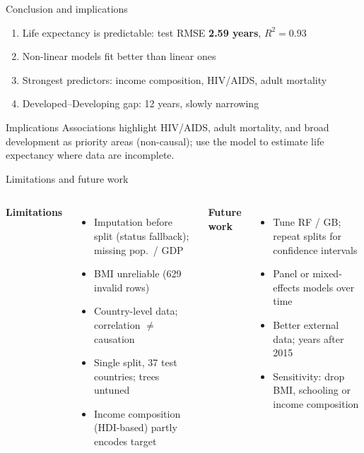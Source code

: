 \begin{frame}{Conclusion and implications}
  \begin{enumerate}
    \item Life expectancy is predictable: test RMSE \textbf{2.59 years}, $R^2=0.93$
    \item Non-linear models fit better than linear ones
    \item Strongest predictors: income composition, HIV/AIDS, adult mortality
    \item Developed--Developing gap: 12 years, slowly narrowing
  \end{enumerate}
  \vspace{0.2cm}
  \begin{block}{Implications}
    \small Associations highlight HIV/AIDS, adult mortality, and broad development as priority areas
    (non-causal); use the model to estimate life expectancy where data are incomplete.
  \end{block}
\end{frame}

\begin{frame}{Limitations and future work}
  \begin{columns}[T]
    \textbf{\color{aupp}Limitations}
    \begin{itemize}\small
      \item Imputation before split (status fallback); missing pop.\ / GDP
      \item BMI unreliable (629 invalid rows)
      \item Country-level data; correlation $\neq$ causation
      \item Single split, 37 test countries; trees untuned
      \item Income composition (HDI-based) partly encodes target
    \end{itemize}
    \textbf{\color{aupp}Future work}
    \begin{itemize}\small
      \item Tune RF / GB; repeat splits for confidence intervals
      \item Panel or mixed-effects models over time
      \item Better external data; years after 2015
      \item Sensitivity: drop BMI, schooling or income composition
    \end{itemize}
  \end{columns}
\end{frame}
